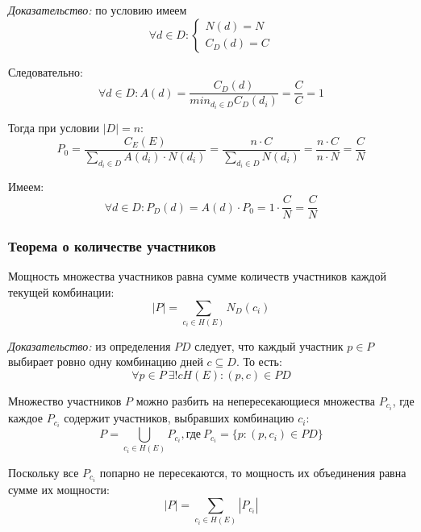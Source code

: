 \textit{Доказательство:} по условию имеем
\begin{equation}
	\forall d \in D:
	\begin{cases}
		N(d) = N \\
		C_D(d) = C
	\end{cases}
\end{equation}

Следовательно:
\begin{equation}
	\forall d \in D: A(d) = \frac{C_D(d)}{min_{d_i \in D}{C_D(d_i)}} = \frac{C}{C} = 1
\end{equation}

Тогда при условии $|D| = n$:
\begin{equation}
	P_0 = \frac{C_E(E)}{\sum_{d_i \in D}{A(d_i) \cdot N(d_i)}} = \frac{n \cdot C}{\sum_{d_i \in D}{N(d_i)}} = \frac{n \cdot C}{n \cdot N} = \frac{C}{N}
\end{equation}

Имеем:
\begin{equation}
	\forall d \in D: P_D(d) = A(d) \cdot P_0 = 1 \cdot \frac{C}{N} = \frac{C}{N}
\end{equation}

\subsubsection{Теорема о количестве участников}

Мощность множества участников равна сумме количеств участников каждой текущей комбинации:
\begin{equation}
	|P| = \sum_{c_i \in H(E)}{N_D(c_i)}
\end{equation}

\textit{Доказательство:} из определения $PD$ следует, что каждый участник $p \in P$ выбирает ровно одну комбинацию дней $c \subseteq D$. То есть:
\begin{equation}
	\forall p \in P \ \exists! c H(E): (p, c) \in PD
\end{equation}

Множество участников $P$ можно разбить на непересекающиеся множества $P_{c_i}$, где каждое $P_{c_i}$ содержит участников, выбравших комбинацию $c_i$:
\begin{equation}
	P = \bigcup_{c_i \in H(E)}{P_{c_i}}, \text{где} \ P_{c_i} = \{p: (p, c_i) \in PD\}
\end{equation}

Поскольку все $P_{c_i}$ попарно не пересекаются, то мощность их объединения равна сумме их мощности:
\begin{equation}
	|P| = \sum_{c_i \in H(E)}{|P_{c_i}|}
\end{equation}

